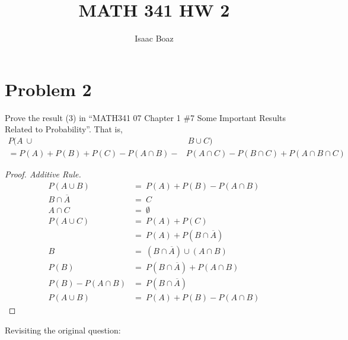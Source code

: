 \documentclass{article}
\title{\vspace{-5ex}MATH 341 HW 2}
\author{Isaac Boaz}
\begin{document}
\maketitle

\section*{Problem 2}
Prove the result (3) in “MATH341 07 Chapter 1 \#7 Some Important Results Related to
Probability”. That is,
\begin{align*}
    P(A\ \cup&\ B \cup C) \\
    = P(A) + P(B) + P(C) - P(A \cap B) -& P(A \cap C) - P(B \cap C) + P(A \cap B \cap C)
\end{align*}
\begin{proof}[Proof. Additive Rule]
    \begin{align*}
        P(A \cup B) &=\ P(A) + P(B) - P(A \cap B) \\
        B \cap \overline{A} &=\ C \\
        A \cap C &=\ \emptyset \\
        P(A \cup C) &=\ P(A) + P(C) \\
        &=\ P(A) + P(B \cap \overline{A}) \\
        B &=\ (B \cap \overline{A}) \cup (A \cap B) \\
        P(B) &=\ P(B \cap \overline{A}) + P(A \cap B) \\
        P(B) - P(A \cap B) &=\ P(B \cap \overline{A}) \\
        P(A \cup B) &=\ P(A) + P(B) - P(A \cap B)
    \end{align*}
\end{proof}
Revisiting the original question:
\end{document}
